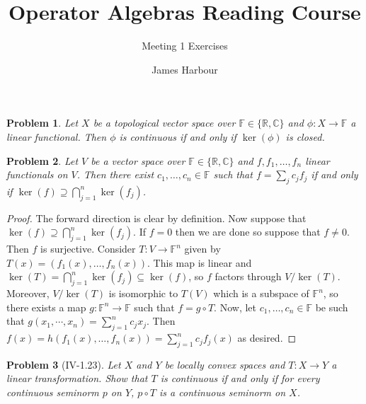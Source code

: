 \documentclass[12pt,letterpaper]{scrartcl}
\title{Operator Algebras Reading Course}
\subtitle{Meeting 1 Exercises}
\author{James Harbour}
\newcommand{\sub}{\subseteq}
\newcommand{\C}{\mathbb{C}}
\newcommand{\F}{\mathbb{F}}
\newcommand{\R}{\mathbb{R}\xspace}
\theoremstyle{mystyle}
\newtheorem*{problem}{Problem}
\theoremstyle{plain}
\theoremstyle{remark}
\begin{document}
\maketitle

\begin{problem}
    Let $X$ be a topological vector space over $\F\in\{\R,\C\}$ and $\phi:X\to \F$ a linear functional. Then $\phi$ is continuous if and only if $\ker(\phi)$ is closed.
\end{problem}

\vspace{3pt}
\begin{problem}
  Let $V$ be a vector space over $\F\in\{\R,\C\}$ and $f,f_1,\ldots,f_n$ linear functionals on $V$. Then there exist $c_1,\ldots,c_n\in\F$ such that $f = \sum_{j}c_j f_j$ if and only if $\ker(f)\supseteq \bigcap_{j=1}^{n}\ker(f_j)$.
\end{problem}

\begin{proof}
  The forward direction is clear by definition. Now suppose that $\ker(f)\supseteq \bigcap_{j=1}^{n}\ker(f_j)$. If $f=0$ then we are done so suppose that $f\neq 0$. Then $f$ is surjective. Consider $T:V\to\F^n$ given by $T(x) = (f_1(x),\ldots,f_n(x))$. This map is linear and $\ker(T) = \bigcap_{j=1}^{n}\ker(f_j)\sub \ker(f)$, so $f$ factors through $V/\ker(T)$. Moreover, $V/\ker(T)$ is isomorphic to $T(V)$ which is a subspace of $\F^n$, so there exists a map $g: \F^n\to \F$ such that $f = g\circ T$. Now, let $c_1,\ldots, c_n\in\F$ be such that $g(x_1,\cdots,x_n) = \sum_{j=1}^{n}c_j x_j$. Then $f(x) = h(f_1(x),\ldots,f_n(x)) = \sum_{j=1}^{n}c_j f_j(x)$ as desired.
\end{proof}

\vspace{3pt}
\begin{problem}[IV-1.23]
  Let $X$ and $Y$ be locally convex spaces and $T:X\to Y$ a linear transformation. Show that $T$ is continuous if and only if for every continuous seminorm $p$ on $Y$, $p\circ T$ is a continuous seminorm on $X$.
\end{problem}
\end{document}
